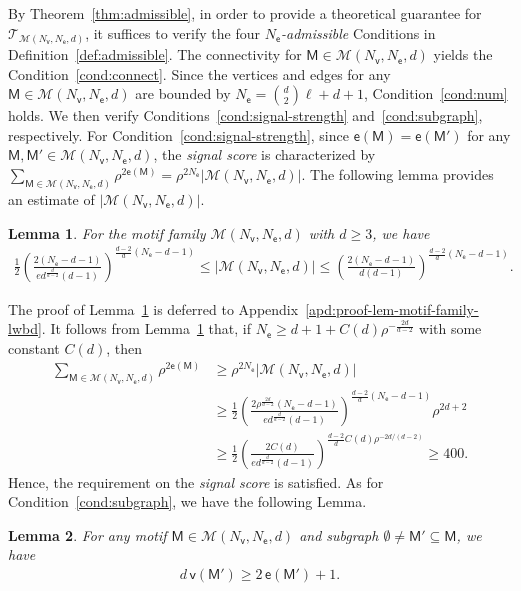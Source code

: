 \documentclass[letterpaper,11pt]{article}
\newtheorem{lemma}{Lemma}
\theoremstyle{definition}
\newcommand{\maM}{\mathcal{M}}
\newcommand{\maT}{\mathcal{T}}
\newcommand{\nbr}[1]{{\sf\color{red}[#1]}}
\newcommand{\en}{\mathsf{{e}}}
\newcommand{\vn}{\mathsf{{v}}}
\newcommand{\pth}[1]{\left( #1 \right)}
\newcommand{\sfM}{{\mathsf{M}}}
\newcommand{\sfe}{{\mathsf{e}}}
\newcommand{\sfv}{{\mathsf{v}}}
\begin{document}
By Theorem~\ref{thm:admissible}, in order to provide a theoretical guarantee for $\maT_{\maM(N_\sfv,N_\sfe,d)}$, it suffices to verify the four \emph{$N_\sfe$-admissible} Conditions in Definition~\ref{def:admissible}. 
The connectivity for $\sfM\in \maM(N_\sfv,N_\sfe,d)$ yields the Condition~\ref{cond:connect}.
Since the vertices and edges for any $\sfM\in \maM(N_\sfv,N_\sfe,d)$ are bounded by $N_\sfe= \binom{d}{2}\ell+d+1$, Condition~\ref{cond:num} holds. We then verify Conditions~\ref{cond:signal-strength} and~\ref{cond:subgraph}, respectively. For Condition~\ref{cond:signal-strength}, since $\en(\sfM) = \en(\sfM')$ for any $\sfM,\sfM'\in \maM(N_\sfv,N_\sfe,d)$, the \emph{signal score} is characterized by $\sum_{\sfM\in \maM(N_\sfv,N_\sfe,d)}\rho^{2\en(\sfM)} = \rho^{2N_\sfe} |\maM(N_\sfv,N_\sfe,d)|$. The following lemma provides an estimate of $|\maM(N_\sfv,N_\sfe,d)|$.

\begin{lemma}\label{lem:motif-family-lwbd}
    For the motif family $ \maM(N_\sfv,N_\sfe,d)$  with $d\ge 3$, we have\begin{align}\label{eq:motif-family-lwbd}
        \frac{1}{2}\pth{\frac{2(N_\sfe-d-1)}{ed^{\frac{d}{d-2}}(d-1)}}^{\frac{d-2}{d}(N_\sfe-d-1)}\le |\maM(N_\sfv,N_\sfe,d)|\le \pth{\frac{2(N_\sfe-d-1)}{d(d-1)}}^{\frac{d-2}{d}(N_\sfe-d-1)}.
    \end{align}
\end{lemma}
 
The proof of Lemma~\ref{lem:motif-family-lwbd} is deferred to Appendix~\ref{apd:proof-lem-motif-family-lwbd}.
It follows from Lemma~\ref{lem:motif-family-lwbd} that, if $N_\sfe\ge d+1+ C(d) \rho^{-\frac{2d}{d-2}}$ with some constant $C(d)$, then \begin{align*}
    \sum_{\sfM\in \maM(N_\sfv,N_\sfe,d)}\rho^{2\en(\sfM)}&\ge \rho^{2N_\sfe}|\maM(N_\sfv,N_\sfe,d)|\\&\ge \frac{1}{2}\pth{\frac{2\rho^{\frac{2d}{d-2}}(N_\sfe-d-1)}{ed^{\frac{d}{d-2}}(d-1)}}^{\frac{d-2}{d}(N_\sfe-d-1)}\rho^{2d+2}\\&\ge\frac{1}{2}\pth{\frac{2C(d)}{ed^{\frac{d}{d-2}}(d-1)}}^{\frac{d-2}{d}C(d)\rho^{-2d/(d-2)}}\ge 400.
\end{align*} Hence, the requirement on the \emph{signal score} is satisfied. As for Condition~\ref{cond:subgraph}, we have the following Lemma.
\begin{lemma}\label{lem:subgraph}
    For any motif $\sfM\in \maM(N_\sfv,N_\sfe,d)$ and subgraph $\emptyset\neq \sfM'\subseteq \sfM$, we have %
    \begin{align*}
        d\,\vn(\sfM')\ge 2\,\en(\sfM')+1.
    \end{align*}
\end{lemma}
\end{document}
